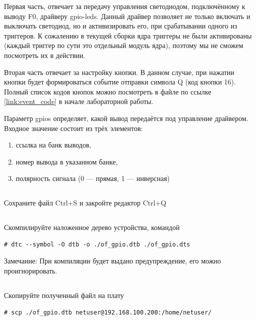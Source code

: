 Первая часть, отвечает за передачу управления светодиодом, подключённому к выводу F0, драйверу gpio-leds. Данный драйвер позволяет не только включать и выключать светодиод, но и активизировать его, при срабатывании одного из триггеров. К сожалению в текущей сборки ядра триггеры не были активированы (каждый триггер по сути это отдельный модуль ядра), поэтому мы не сможем посмотреть их в действии.

Вторая часть отвечает за настройку кнопки. В данном случае, при нажатии кнопки будет формироваться событие отправки символа Q (код кнопки 16). Полный список кодов кнопок можно посмотреть в файле по ссылке \ref{link:event_code} в начале лабораторной работы.

Параметр gpios определяет, какой вывод передаётся под управление драйвером. Входное значение состоит из трёх элементов:
\begin{enumerate}
	\item ссылка на банк выводов,
	\item номер вывода в указанном банке,
	\item полярность сигнала (0 — прямая, 1 — инверсная)
\end{enumerate}

\subsection{} Сохраните файл Ctrl+S и закройте редактор Ctrl+Q

\subsection{} Скомпилируйте наложенное дерево устройства, командой \label{lab_gpio:dts_compile}
\begin{lstlisting}[style=bash]
# dtc --symbol -O dtb -o ./of_gpio.dtb ./of_gpio.dts
\end{lstlisting}
\begin{Notes}{Замечание:}
	При компиляции будет выдано предупреждение, его можно проигнорировать.
\end{Notes}

\subsection{} Скопируйте полученный файл на плату
\begin{lstlisting}[style=bash]
# scp ./of_gpio.dtb netuser@192.168.100.200:/home/netuser/
\end{lstlisting}

